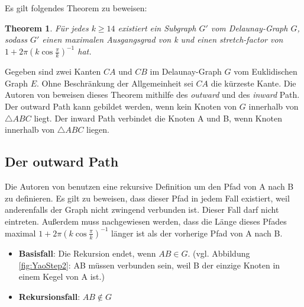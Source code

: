 \documentclass[a4paper,twoside]{IEEEtran}
\newtheorem{boundedSpannerTheorem}{Theorem}[section]
\begin{document}
Es gilt folgendes Theorem zu beweisen:

\begin{boundedSpannerTheorem}
Für jedes $k \geq 14 $ existiert ein Subgraph $G' $ vom Delaunay-Graph $G $, sodass $G' $ einen maximalen Ausgangsgrad von k und einen stretch-factor von $1+2\pi(k \cos{\frac{\pi}{k}})^{-1} $ hat.
\end{boundedSpannerTheorem}
Gegeben sind zwei Kanten $CA $ und $CB $ im Delaunay-Graph $G $ vom Euklidischen Graph $E $.
Ohne Beschränkung der Allgemeinheit sei $CA $ die kürzeste Kante.
Die Autoren von \cite{kanj} beweisen dieses Theorem mithilfe des \emph{outward} und des \emph{inward} Path. %
Der outward Path kann gebildet werden, wenn kein Knoten von $G $ innerhalb von $\triangle {ABC} $ liegt.
Der inward Path verbindet die Knoten A und B, wenn Knoten innerhalb von $\triangle {ABC} $ liegen.

\subsection{Der outward Path}
Die Autoren von \cite{kanj} benutzen eine rekursive Definition um den Pfad von A nach B zu definieren.
Es gilt zu beweisen, dass dieser Pfad in jedem Fall existiert, weil anderenfalls der Graph nicht zwingend verbunden ist.
Dieser Fall darf nicht eintreten.
Außerdem muss nachgewiesen werden, dass die Länge dieses Pfades maximal
$1+2\pi(k \cos{\frac{\pi}{k}})^{-1} $ länger ist als der vorherige Pfad von A nach B.


\begin{itemize}
\item \textbf{Basisfall}: Die Rekursion endet, wenn $AB \in G $. (vgl. Abbildung \ref{fig:YaoStep2}: AB müssen verbunden sein, weil B der einzige Knoten in einem Kegel von A ist.)
\item \textbf{Rekursionsfall}: $AB \notin G $
\end{itemize}
\end{document}
